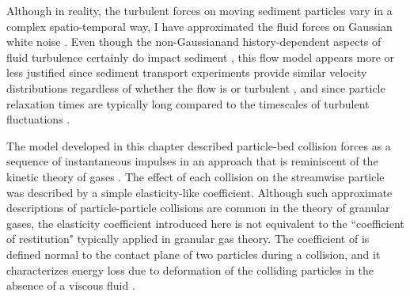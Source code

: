 Although in reality, the turbulent forces on moving sediment particles vary in a complex spatio-temporal way, I have approximated the fluid forces on \DIFdelbegin {}\DIFdelend \DIFaddbegin {}\DIFaddend Gaussian white noise \DIFaddbegin {}\DIFaddend . Even though the non-Gaussian\DIFaddbegin {}\DIFaddend and history-dependent aspects of fluid turbulence certainly do impact sediment \DIFdelbegin {}\DIFdelend \DIFaddbegin {}\DIFaddend \citep{Cameron2020,Celik2014}, this flow model appears more or less justified since sediment transport experiments provide similar velocity distributions regardless of whether the flow is \DIFdelbegin {}\DIFdelend \DIFaddbegin {}\DIFaddend or turbulent \citep{Lajeunesse2010, Charru2004}, and since particle relaxation times are typically long compared to the timescales of turbulent fluctuations \citep{Hofland2006,Schmeeckle2007,Nakagawa1981}.
\DIFaddbegin {}\DIFaddend 

The model developed in this chapter described particle-bed collision forces as a sequence of instantaneous impulses in an approach that is reminiscent of the kinetic theory of gases \DIFdelbegin {}\DIFdelend \DIFaddbegin {}\DIFaddend .
The effect of each collision on the streamwise particle \DIFdelbegin {}\DIFdelend \DIFaddbegin {}\DIFaddend was described by a simple elasticity-like coefficient.
Although such approximate descriptions of particle-particle collisions are common in the theory of granular gases, the elasticity coefficient introduced here is not equivalent to the ``coefficient of restitution" typically applied in granular gas theory.
The coefficient of \DIFdelbegin {}\DIFdelend \DIFaddbegin {}\DIFaddend is defined normal to the contact plane of two particles during a collision, and it characterizes energy loss due to deformation of the colliding particles in the absence of a viscous fluid \citep{Brach1992,Ismail2008}.

